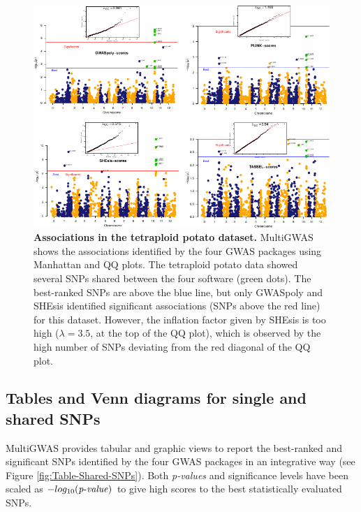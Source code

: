 \documentclass{article}
\begin{document}
\begin{figure}[H]
\begin{centering}
\includegraphics{images/paper-manhattan-QQ-plots}
\par\end{centering}
\caption{\textbf{{Associations in the tetraploid potato dataset.}} MultiGWAS shows the associations identified by the four GWAS packages using Manhattan and QQ plots. The tetraploid potato data showed several SNPs shared between the four software (green dots). The best-ranked SNPs are above the blue line, but only GWASpoly and SHEsis identified significant associations (SNPs above the red line) for this dataset. However, the inflation factor given by SHEsis is too high ($\lambda=3.5$, at the top of the QQ plot), which is observed by the high number of SNPs deviating from the red diagonal of the QQ plot. \label{fig:view-qqmanhattan}}
\end{figure}


\subsection{Tables and Venn diagrams for single and shared SNPs}

MultiGWAS provides tabular and graphic views to report the best-ranked and significant SNPs identified by the four GWAS packages in an integrative way (see Figure \ref{fig:Table-Shared-SNPs}). Both \emph{p-values} and significance levels have been scaled as $-log_{10}({\operatorname{\mathit{p-value}}})$ to give high scores to the best statistically evaluated SNPs.
\end{document}
